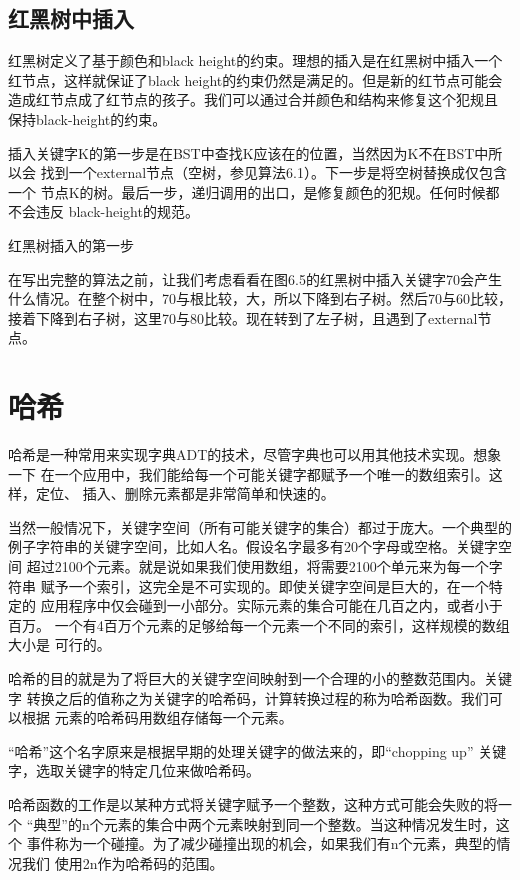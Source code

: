 \subsection{红黑树中插入}
红黑树定义了基于颜色和black height的约束。理想的插入是在红黑树中插入一个
红节点，这样就保证了black height的约束仍然是满足的。但是新的红节点可能会
造成红节点成了红节点的孩子。我们可以通过合并颜色和结构来修复这个犯规且
保持black-height的约束。

插入关键字K的第一步是在BST中查找K应该在的位置，当然因为K不在BST中所以会
找到一个external节点（空树，参见算法6.1）。下一步是将空树替换成仅包含一个
节点K的树。最后一步，递归调用的出口，是修复颜色的犯规。任何时候都不会违反
black-height的规范。

\begin{example}
红黑树插入的第一步

在写出完整的算法之前，让我们考虑看看在图6.5的红黑树中插入关键字70会产生
什么情况。在整个树中，70与根比较，大，所以下降到右子树。然后70与60比较，
接着下降到右子树，这里70与80比较。现在转到了左子树，且遇到了external节点。
\end{example}

\section{哈希}
哈希是一种常用来实现字典ADT的技术，尽管字典也可以用其他技术实现。想象一下
在一个应用中，我们能给每一个可能关键字都赋予一个唯一的数组索引。这样，定位、
插入、删除元素都是非常简单和快速的。

当然一般情况下，关键字空间（所有可能关键字的集合）都过于庞大。一个典型的
例子字符串的关键字空间，比如人名。假设名字最多有20个字母或空格。关键字空间
超过2100个元素。就是说如果我们使用数组，将需要2100个单元来为每一个字符串
赋予一个索引，这完全是不可实现的。即使关键字空间是巨大的，在一个特定的
应用程序中仅会碰到一小部分。实际元素的集合可能在几百之内，或者小于百万。
一个有4百万个元素的足够给每一个元素一个不同的索引，这样规模的数组大小是
可行的。

哈希的目的就是为了将巨大的关键字空间映射到一个合理的小的整数范围内。关键字
转换之后的值称之为关键字的哈希码，计算转换过程的称为哈希函数。我们可以根据
元素的哈希码用数组存储每一个元素。

“哈希”这个名字原来是根据早期的处理关键字的做法来的，即“chopping up”
关键字，选取关键字的特定几位来做哈希码。

哈希函数的工作是以某种方式将关键字赋予一个整数，这种方式可能会失败的将一个
“典型”的n个元素的集合中两个元素映射到同一个整数。当这种情况发生时，这个
事件称为一个碰撞。为了减少碰撞出现的机会，如果我们有n个元素，典型的情况我们
使用2n作为哈希码的范围。

